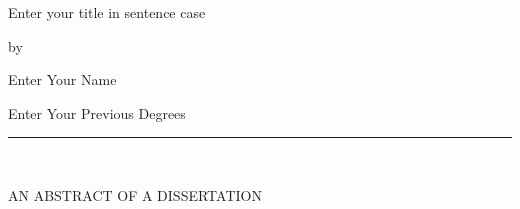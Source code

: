 \begin{center}

   \vspace{1cm}


   \large Enter your title in sentence case\\

   \vspace{0.5cm}

   by\\

   \vspace{0.5cm}


   \large Enter Your Name\\

   \vspace{0.5cm}


   Enter Your Previous Degrees\\

   \vspace{0.55cm}
   \rule{2in}{0.5pt}\\
   \vspace{0.75cm}

   {\large AN ABSTRACT OF A DISSERTATION}\\


\end{center}

